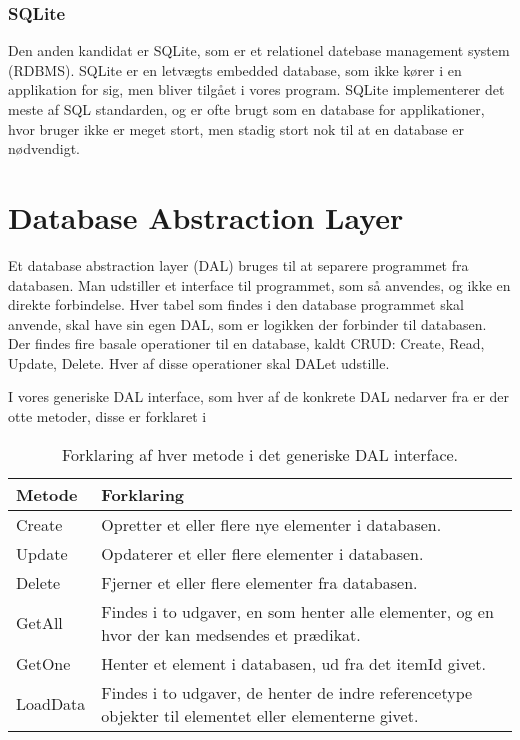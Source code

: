 \subsubsection*{SQLite}
Den anden kandidat er SQLite, som er et relationel datebase management system (RDBMS).
SQLite er en letvægts embedded database, som ikke kører i en applikation for sig, men bliver tilgået i vores program.
SQLite implementerer det meste af SQL standarden, og er ofte brugt som en database for applikationer, hvor bruger ikke er meget stort, men stadig stort nok til at en database er nødvendigt.


\section{Database Abstraction Layer}
Et database abstraction layer (DAL) bruges til at separere programmet fra databasen.
Man udstiller et interface til programmet, som så anvendes, og ikke en direkte forbindelse.
Hver tabel som findes i den database programmet skal anvende, skal have sin egen DAL, som er logikken der forbinder til databasen.
Der findes fire basale operationer til en database, kaldt CRUD: Create, Read, Update, Delete. 
Hver af disse operationer skal DALet udstille. 

I vores generiske DAL interface, som hver af de konkrete DAL nedarver fra er der otte metoder, disse er forklaret i 

\begin{table}[h]
    \begin{tabular}{p{2cm}|p{13cm}}
    \textbf{Metode}   & \textbf{Forklaring}       \\ \hline
    Create   & Opretter et eller flere nye elementer i databasen.                                                    \\ \hline
    Update   & Opdaterer et eller flere elementer i databasen.                                                       \\ \hline
    Delete   & Fjerner et eller flere elementer fra databasen.                                                       \\ \hline
    GetAll   & Findes i to udgaver, en som henter alle elementer, og en hvor der kan medsendes et prædikat.          \\ \hline
    GetOne   & Henter et element i databasen, ud fra det itemId givet.                                               \\ \hline
    LoadData & Findes i to udgaver, de henter de indre referencetype objekter til elementet eller elementerne givet. \\ \hline
    \end{tabular}
    \caption{Forklaring af hver metode i det generiske DAL interface.}
    \label{tab:ourExtCrud}
\end{table}

